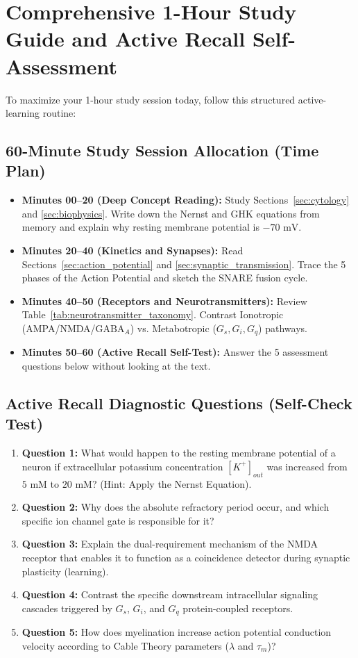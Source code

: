 \documentclass[10pt,journal,compsoc,onecolumn]{IEEEtran}
\begin{document}
\section{Comprehensive 1-Hour Study Guide and Active Recall Self-Assessment}
\label{sec:study_guide}

To maximize your 1-hour study session today, follow this structured active-learning routine:

\subsection{60-Minute Study Session Allocation (Time Plan)}

\begin{itemize}
    \item \textbf{Minutes 00–20 (Deep Concept Reading):} Study Sections~\ref{sec:cytology} and \ref{sec:biophysics}. Write down the Nernst and GHK equations from memory and explain why resting membrane potential is $-70\text{ mV}$.
    \item \textbf{Minutes 20–40 (Kinetics and Synapses):} Read Sections~\ref{sec:action_potential} and \ref{sec:synaptic_transmission}. Trace the 5 phases of the Action Potential and sketch the SNARE fusion cycle.
    \item \textbf{Minutes 40–50 (Receptors and Neurotransmitters):} Review Table~\ref{tab:neurotransmitter_taxonomy}. Contrast Ionotropic (AMPA/NMDA/$\text{GABA}_A$) vs. Metabotropic ($G_s, G_i, G_q$) pathways.
    \item \textbf{Minutes 50–60 (Active Recall Self-Test):} Answer the 5 assessment questions below without looking at the text.
\end{itemize}

\subsection{Active Recall Diagnostic Questions (Self-Check Test)}

\begin{enumerate}
    \item \textbf{Question 1:} What would happen to the resting membrane potential of a neuron if extracellular potassium concentration $[K^+]_{out}$ was increased from $5\text{ mM}$ to $20\text{ mM}$? (Hint: Apply the Nernst Equation).
    \item \textbf{Question 2:} Why does the absolute refractory period occur, and which specific ion channel gate is responsible for it?
    \item \textbf{Question 3:} Explain the dual-requirement mechanism of the NMDA receptor that enables it to function as a coincidence detector during synaptic plasticity (learning).
    \item \textbf{Question 4:} Contrast the specific downstream intracellular signaling cascades triggered by $G_s$, $G_i$, and $G_q$ protein-coupled receptors.
    \item \textbf{Question 5:} How does myelination increase action potential conduction velocity according to Cable Theory parameters ($\lambda$ and $\tau_m$)?
\end{enumerate}
\end{document}
